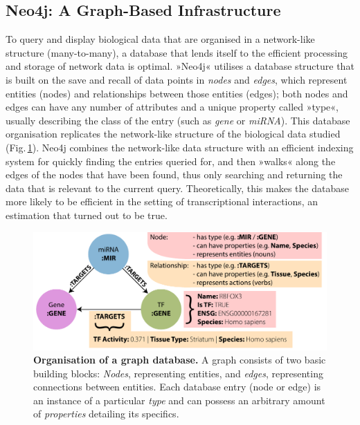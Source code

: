 \subsection{Neo4j: A Graph-Based Infrastructure}
To query and display biological data that are organised in a network-like structure (many-to-many), a database that lends itself to the efficient processing and storage of network data is optimal. »Neo4j« utilises a database structure that is built on the save and recall of data points in \emph{nodes} and \emph{edges}, which represent entities (nodes) and relationships between those entities (edges); both nodes and edges can have any number of attributes and a unique property called »type«, usually describing the class of the entry (such as \emph{gene} or \emph{miRNA}). This database organisation replicates the network-like structure of the biological data studied (Fig.\,\ref{fig:graph-org}). Neo4j combines the network-like data structure with an efficient indexing system for quickly finding the entries queried for, and then »walks« along the edges of the nodes that have been found, thus only searching and returning the data that is relevant to the current query. Theoretically, this makes the database more likely to be efficient in the setting of transcriptional interactions, an estimation that turned out to be true.

\begin{figure}
\includegraphics[width=\textwidth]{figures/graph-org}
\caption[Graph database organisation.]{\textbf{Organisation of a graph database.} A graph consists of two basic building blocks: \textit{Nodes}, representing entities, and \textit{edges}, representing connections between entities. Each database entry (node or edge) is an instance of a particular \textit{type} and can possess an arbitrary amount of \textit{properties} detailing its specifics.
\label{fig:graph-org}}
\end{figure}

